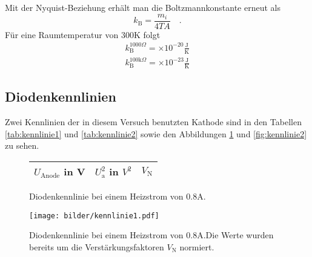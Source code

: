		Mit der Nyquist-Beziehung erhält man die Boltzmannkonstante erneut als
		\begin{equation}
		k_\text{B}=\frac{m_i}{4 T A} \quad .
		\end{equation}
 		Für eine Raumtemperatur von $300$K folgt
		\begin{align}
		k_\text{B}^{1000\Omega}			=   \times 10^{-20}\frac{\text{J}}
																			{\text{K}} \\
		k_\text{B}^{100\text{k}\Omega}	=   \times 10^{-23}\frac{\text{J}}
																			{\text{K}}
		\end{align}




\clearpage
\subsection{Diodenkennlinien}
	Zwei Kennlinien der in diesem Versuch benutzten Kathode sind in
	den Tabellen \ref{tab:kennlinie1} und \ref{tab:kennlinie2} sowie
	den Abbildungen \ref{fig:kennlinie1} und \ref{fig:kennlinie2} zu
	sehen.

	\begin{figure}[htbp]
	\begin{minipage}{0.4\textwidth}
			\centering
			\begin{tabular}{ccc}
				\toprule \midrule
				$U_\text{Anode}$ in V & $U_\text{a}^2$ in $V^2$
				& $V_\text{N}$\\
				\midrule
				
				\midrule \bottomrule
			\end{tabular}
			\caption{Diodenkennlinie bei einem Heizstrom von
			$0.8$A.}
			\label{tab:kennlinie1}
	\end{minipage}
	\hfill
	\begin{minipage}{0.6\textwidth}
			\centering
			\texttt{[image: bilder/kennlinie1.pdf]}
			\caption{Diodenkennlinie bei einem Heizstrom von
			$0.8$A.Die Werte wurden bereits um die
			Verstärkungsfaktoren $V_\text{N}$ normiert. }
			\label{fig:kennlinie1}
	\end{minipage}
	\end{figure}



